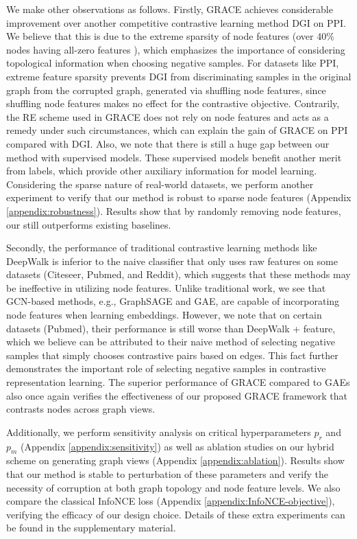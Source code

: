 \documentclass{article}
\theoremstyle{remark}
\begin{document}
We make other observations as follows.
Firstly, GRACE achieves considerable improvement over another competitive contrastive learning method DGI on PPI. We believe that this is due to the extreme sparsity of node features (over 40\% nodes having all-zero features \cite{Hamilton:2017tp}), which emphasizes the importance of considering topological information when choosing negative samples. For datasets like PPI, extreme feature sparsity prevents DGI from discriminating samples in the original graph from the corrupted graph, generated via shuffling node features, since shuffling node features makes no effect for the contrastive objective.
Contrarily, the RE scheme used in GRACE does not rely on node features and acts as a remedy under such circumstances, which can explain the gain of GRACE on PPI compared with DGI.
Also, we note that there is still a huge gap between our method with supervised models. These supervised models benefit another merit from labels, which provide other auxiliary information for model learning.
Considering the sparse nature of real-world datasets, we perform another experiment to verify that our method is robust to sparse node features (Appendix \ref{appendix:robustness}). Results show that by randomly removing node features, our still outperforms existing baselines.

Secondly, the performance of traditional contrastive learning methods like DeepWalk is inferior to the naive classifier that only uses raw features on some datasets (Citeseer, Pubmed, and Reddit), which suggests that these methods may be ineffective in utilizing node features.
Unlike traditional work, we see that GCN-based methods, e.g., GraphSAGE and GAE, are capable of incorporating node features when learning embeddings. However, we note that on certain datasets (Pubmed), their performance is still worse than DeepWalk + feature, which we believe can be attributed to their naive method of selecting negative samples that simply chooses contrastive pairs based on edges.
This fact further demonstrates the important role of selecting negative samples in contrastive representation learning. The superior performance of GRACE compared to GAEs also once again verifies the effectiveness of our proposed GRACE framework that contrasts nodes across graph views.



Additionally, we perform sensitivity analysis on critical hyperparameters \(p_r\) and \(p_m\) (Appendix \ref{appendix:sensitivity}) as well as ablation studies on our hybrid scheme on generating graph views (Appendix \ref{appendix:ablation}). Results show that our method is stable to perturbation of these parameters and verify the necessity of corruption at both graph topology and node feature levels. We also compare the classical InfoNCE loss (Appendix \ref{appendix:InfoNCE-objective}), verifying the efficacy of our design choice. Details of these extra experiments can be found in the supplementary material.
\end{document}
